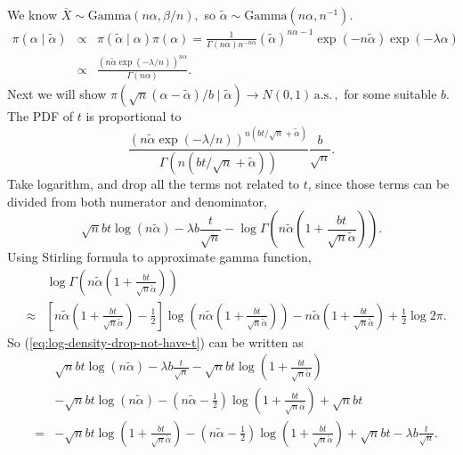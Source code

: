 \documentclass[oneside,english]{amsbook}
\numberwithin{section}{chapter}
\numberwithin{equation}{section}
\numberwithin{figure}{section}
\theoremstyle{plain}
\theoremstyle{plain}
\theoremstyle{definition}
\theoremstyle{plain}
\theoremstyle{plain}
\theoremstyle{remark}
\theoremstyle{definition}
\theoremstyle{definition}
\newcommand{\ascv}{\,\mathrm{a.s.}\,}
\begin{document}
We know $\overline{X}\sim\mathrm{Gamma}\left(n\alpha,\beta/n\right),$
so $\tilde{\alpha}\sim\mathrm{Gamma}\left(n\alpha,n^{-1}\right).$
\begin{eqnarray*}
\pi\left(\alpha\mid\tilde{\alpha}\right) & \propto & \pi\left(\tilde{\alpha}\mid\alpha\right)\pi\left(\alpha\right)=\frac{1}{\Gamma\left(n\alpha\right)n^{-n\alpha}}\left(\tilde{\alpha}\right)^{n\alpha-1}\exp\left(-n\tilde{\alpha}\right)\exp\left(-\lambda\alpha\right)\\
 & \propto & \frac{\left(n\tilde{\alpha}\exp\left(-\lambda/n\right)\right)^{n\alpha}}{\Gamma\left(n\alpha\right)}.
\end{eqnarray*}
Next we will show $\pi\left(\sqrt{n}\left(\alpha-\tilde{\alpha}\right)/b\mid\tilde{\alpha}\right)\rightarrow N\left(0,1\right)\ascv,$
for some suitable $b$. The PDF of $t$ is proportional to 
\[
\frac{\left(n\tilde{\alpha}\exp\left(-\lambda/n\right)\right)^{n\left(bt/\sqrt{n}+\tilde{\alpha}\right)}}{\Gamma\left(n\left(bt/\sqrt{n}+\tilde{\alpha}\right)\right)}\frac{b}{\sqrt{n}}.
\]
Take logarithm, and drop all the terms not related to $t$, since
those terms can be divided from both numerator and denominator, 
\begin{equation}
\sqrt{n}bt\log\left(n\tilde{\alpha}\right)-\lambda b\frac{t}{\sqrt{n}}-\log\Gamma\left(n\tilde{\alpha}\left(1+\frac{bt}{\sqrt{n}\tilde{\alpha}}\right)\right).\label{eq:log-density-drop-not-have-t}
\end{equation}
Using Stirling formula to approximate gamma function, 
\begin{eqnarray*}
 &  & \log\Gamma\left(n\tilde{\alpha}\left(1+\frac{bt}{\sqrt{n}\tilde{\alpha}}\right)\right)\\
 & \approx & \left[n\tilde{\alpha}\left(1+\frac{bt}{\sqrt{n}\tilde{\alpha}}\right)-\frac{1}{2}\right]\log\left(n\tilde{\alpha}\left(1+\frac{bt}{\sqrt{n}\tilde{\alpha}}\right)\right)-n\tilde{\alpha}\left(1+\frac{bt}{\sqrt{n}\tilde{\alpha}}\right)+\frac{1}{2}\log2\pi.
\end{eqnarray*}
So (\ref{eq:log-density-drop-not-have-t}) can be written as 
\begin{eqnarray}
 &  & \sqrt{n}bt\log\left(n\tilde{\alpha}\right)-\lambda b\frac{t}{\sqrt{n}}-\sqrt{n}bt\log\left(1+\frac{bt}{\sqrt{n}\tilde{\alpha}}\right)\nonumber \\
 &  & -\sqrt{n}bt\log\left(n\tilde{\alpha}\right)-\left(n\tilde{\alpha}-\frac{1}{2}\right)\log\left(1+\frac{bt}{\sqrt{n}\tilde{\alpha}}\right)+\sqrt{n}bt\nonumber \\
 & = & -\sqrt{n}bt\log\left(1+\frac{bt}{\sqrt{n}\tilde{\alpha}}\right)-\left(n\tilde{\alpha}-\frac{1}{2}\right)\log\left(1+\frac{bt}{\sqrt{n}\tilde{\alpha}}\right)+\sqrt{n}bt-\lambda b\frac{t}{\sqrt{n}}.\label{eq:log-density-after-stirling}
\end{eqnarray}
\end{document}
